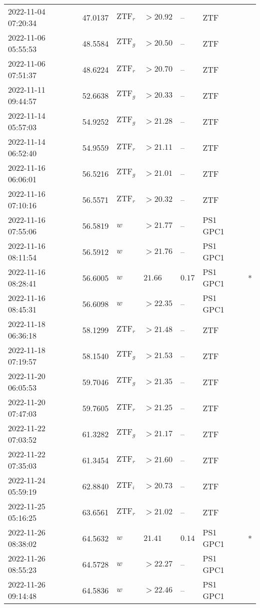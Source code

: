 \documentclass{nature_plusfigure}
\begin{document}
\begin{supplement}
\begin{center}
\begin{longtable}{lllllll}
2022-11-04 07:20:34 & 47.0137 & $\mathrm{ZTF}_{r}$ & $>20.92$ & -- & ZTF &  \\ 
2022-11-06 05:55:53 & 48.5584 & $\mathrm{ZTF}_{g}$ & $>20.50$ & -- & ZTF &  \\ 
2022-11-06 07:51:37 & 48.6224 & $\mathrm{ZTF}_{r}$ & $>20.70$ & -- & ZTF &  \\ 
2022-11-11 09:44:57 & 52.6638 & $\mathrm{ZTF}_{g}$ & $>20.33$ & -- & ZTF &  \\ 
2022-11-14 05:57:03 & 54.9252 & $\mathrm{ZTF}_{g}$ & $>21.28$ & -- & ZTF &  \\ 
2022-11-14 06:52:40 & 54.9559 & $\mathrm{ZTF}_{r}$ & $>21.11$ & -- & ZTF &  \\ 
2022-11-16 06:06:01 & 56.5216 & $\mathrm{ZTF}_{g}$ & $>21.01$ & -- & ZTF &  \\ 
2022-11-16 07:10:16 & 56.5571 & $\mathrm{ZTF}_{r}$ & $>20.32$ & -- & ZTF &  \\ 
2022-11-16 07:55:06 & 56.5819 & $w$ & $>21.77$ & -- & PS1 GPC1 &  \\ 
2022-11-16 08:11:54 & 56.5912 & $w$ & $>21.76$ & -- & PS1 GPC1 &  \\ 
2022-11-16 08:28:41 & 56.6005 & $w$ & $21.66$ & $0.17$ & PS1 GPC1 & * \\ 
2022-11-16 08:45:31 & 56.6098 & $w$ & $>22.35$ & -- & PS1 GPC1 &  \\ 
2022-11-18 06:36:18 & 58.1299 & $\mathrm{ZTF}_{r}$ & $>21.48$ & -- & ZTF &  \\ 
2022-11-18 07:19:57 & 58.1540 & $\mathrm{ZTF}_{g}$ & $>21.53$ & -- & ZTF &  \\ 
2022-11-20 06:05:53 & 59.7046 & $\mathrm{ZTF}_{g}$ & $>21.35$ & -- & ZTF &  \\ 
2022-11-20 07:47:03 & 59.7605 & $\mathrm{ZTF}_{r}$ & $>21.25$ & -- & ZTF &  \\ 
2022-11-22 07:03:52 & 61.3282 & $\mathrm{ZTF}_{g}$ & $>21.17$ & -- & ZTF &  \\ 
2022-11-22 07:35:03 & 61.3454 & $\mathrm{ZTF}_{r}$ & $>21.60$ & -- & ZTF &  \\ 
2022-11-24 05:59:19 & 62.8840 & $\mathrm{ZTF}_{i}$ & $>20.73$ & -- & ZTF &  \\ 
2022-11-25 05:16:25 & 63.6561 & $\mathrm{ZTF}_{r}$ & $>21.02$ & -- & ZTF &  \\ 
2022-11-26 08:38:02 & 64.5632 & $w$ & $21.41$ & $0.14$ & PS1 GPC1 & * \\ 
2022-11-26 08:55:23 & 64.5728 & $w$ & $>22.27$ & -- & PS1 GPC1 &  \\ 
2022-11-26 09:14:48 & 64.5836 & $w$ & $>22.46$ & -- & PS1 GPC1 &  \\ 

\end{longtable}
\end{center}
\end{supplement}
\end{document}
